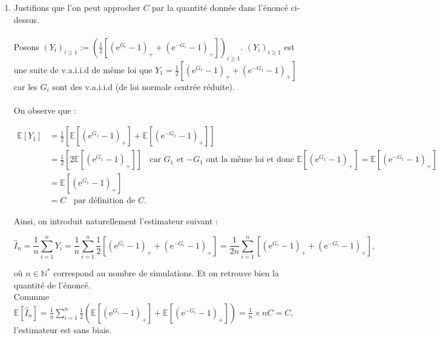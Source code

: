 \documentclass{article}
\theoremstyle{exostyle}
\newenvironment{questions}{
\begin{enumerate}[\hspace{12pt} 1.]}{\end{enumerate}}
\begin{document}
\begin{questions}

\bigbreak

\item Justifions que l'on peut approcher $C$ par la quantité donnée dans l'énoncé ci-dessus.\\
\\

Posons $(Y_{i})_{i \geq 1} := \left( \frac{1}{2} \left[ \left( \text{e}^{G_{i}} - 1 \right)_{+} + \left( \text{e}^{-G_{i}} - 1 \right)_{+} \right] \right)_{i \geq 1}$. $(Y_{i})_{i \geq 1}$ est une suite de v.a.i.i.d de même loi que $Y_{1} = \frac{1}{2} \left[ \left( \text{e}^{G_{1}} - 1 \right)_{+} + \left( \text{e}^{-G_{1}} - 1 \right)_{+} \right]$ car les $G_{i}$ sont des v.a.i.i.d (de loi normale centrée réduite).\\
\\ 

On observe que : 

\begin{align*}
    \mathbb{E} [Y_{1}] &= \frac{1}{2} \left[ \mathbb{E} \left[ \left( \text{e}^{G_{1}} - 1 \right)_{+} \right] + \mathbb{E} \left[ \left( \text{e}^{-G_{1}} - 1 \right)_{+} \right] \right]\\
    &= \frac{1}{2} \left[ 2 \mathbb{E} \left[ \left( \text{e}^{G_{1}} - 1 \right)_{+} \right] \right] \ \ \ \ \text{car $G_{1}$ et $-G_{1}$ ont la même loi et donc $\mathbb{E} \left[\left( \text{e}^{G_{1}} - 1 \right)_{+} \right] = \mathbb{E} \left[\left( \text{e}^{-G_{1}} - 1 \right)_{+} \right]$}\\
    &= \mathbb{E} \left[\left( \text{e}^{G_{1}} - 1 \right)_{+} \right]\\
    &= C \ \ \ \ \text{par définition de $C$.}
\end{align*}

Ainsi, on introduit naturellement l'estimateur suivant :

\[\hat{I}_{n} = \frac{1}{n} \sum_{i=1}^{n} Y_{i} = \frac{1}{n} \sum_{i=1}^{n} \frac{1}{2} \left[ \left( \text{e}^{G_{i}} - 1 \right)_{+} + \left( \text{e}^{-G_{i}} - 1 \right)_{+} \right] =  \frac{1}{2n} \sum_{i=1}^{n} \left[ \left( \text{e}^{G_{i}} - 1 \right)_{+} + \left( \text{e}^{-G_{i}} - 1 \right)_{+} \right],\]

où $n \in \mathbb{N}^{*}$ correspond au nombre de simulations. Et on retrouve bien la quantité de l'énoncé.\\

Commme $\mathbb{E} [\hat{I}_{n}] = \frac{1}{n}  \sum_{i=1}^{n} \frac{1}{2} \left( \mathbb{E} \left[  \left( \text{e}^{G_{i}} - 1 \right)_{+} \right] + \mathbb{E} \left[ \left( \text{e}^{-G_{i}} - 1 \right)_{+} \right] \right) = \frac{1}{n} \times nC = C$, l'estimateur est sans biais.\\
\\


\end{questions}
\end{document}
